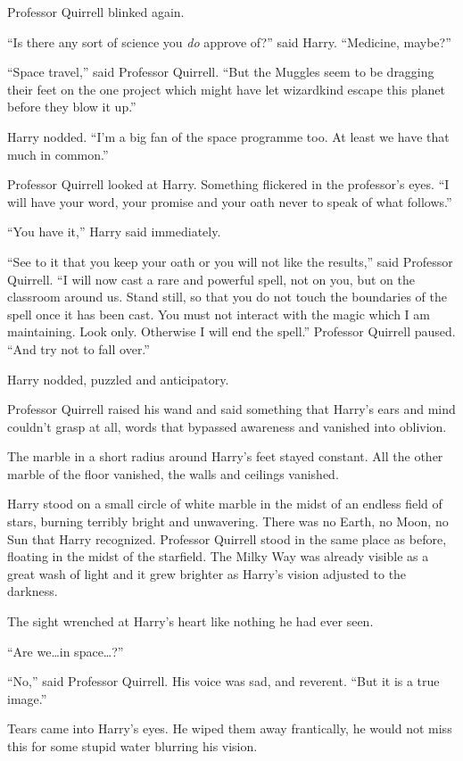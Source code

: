 Professor Quirrell blinked again.

“Is there any sort of science you \emph{do} approve of?” said Harry. “Medicine, maybe?”

“Space travel,” said Professor Quirrell. “But the Muggles seem to be dragging their feet on the one project which might have let wizardkind escape this planet before they blow it up.”

Harry nodded. “I’m a big fan of the space programme too. At least we have that much in common.”

Professor Quirrell looked at Harry. Something flickered in the professor’s eyes. “I will have your word, your promise and your oath never to speak of what follows.”

“You have it,” Harry said immediately.

“See to it that you keep your oath or you will not like the results,” said Professor Quirrell. “I will now cast a rare and powerful spell, not on you, but on the classroom around us. Stand still, so that you do not touch the boundaries of the spell once it has been cast. You must not interact with the magic which I am maintaining. Look only. Otherwise I will end the spell.” Professor Quirrell paused. “And try not to fall over.”

Harry nodded, puzzled and anticipatory.

Professor Quirrell raised his wand and said something that Harry’s ears and mind couldn’t grasp at all, words that bypassed awareness and vanished into oblivion.

The marble in a short radius around Harry’s feet stayed constant. All the other marble of the floor vanished, the walls and ceilings vanished.

Harry stood on a small circle of white marble in the midst of an endless field of stars, burning terribly bright and unwavering. There was no Earth, no Moon, no Sun that Harry recognized. Professor Quirrell stood in the same place as before, floating in the midst of the starfield. The Milky Way was already visible as a great wash of light and it grew brighter as Harry’s vision adjusted to the darkness.

The sight wrenched at Harry’s heart like nothing he had ever seen.

“Are we…in space…?”

“No,” said Professor Quirrell. His voice was sad, and reverent. “But it is a true image.”

Tears came into Harry’s eyes. He wiped them away frantically, he would not miss this for some stupid water blurring his vision.

